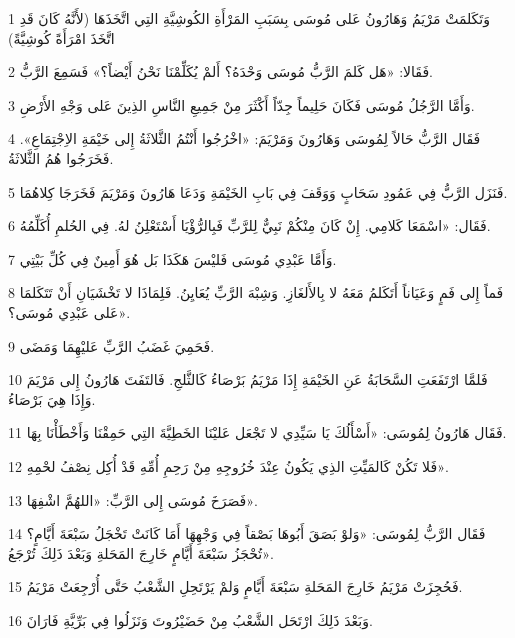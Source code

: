 \par 1 وَتَكَلمَتْ مَرْيَمُ وَهَارُونُ عَلى مُوسَى بِسَبَبِ المَرْأَةِ الكُوشِيَّةِ التِي اتَّخَذَهَا (لأَنَّهُ كَانَ قَدِ اتَّخَذَ امْرَأَةً كُوشِيَّةً)
\par 2 فَقَالا: «هَل كَلمَ الرَّبُّ مُوسَى وَحْدَهُ؟ أَلمْ يُكَلِّمْنَا نَحْنُ أَيْضاً؟» فَسَمِعَ الرَّبُّ.
\par 3 وَأَمَّا الرَّجُلُ مُوسَى فَكَانَ حَلِيماً جِدّاً أَكْثَرَ مِنْ جَمِيعِ النَّاسِ الذِينَ عَلى وَجْهِ الأَرْضِ.
\par 4 فَقَال الرَّبُّ حَالاً لِمُوسَى وَهَارُونَ وَمَرْيَمَ: «اخْرُجُوا أَنْتُمُ الثَّلاثَةُ إِلى خَيْمَةِ الاِجْتِمَاعِ». فَخَرَجُوا هُمُ الثَّلاثَةُ.
\par 5 فَنَزَل الرَّبُّ فِي عَمُودِ سَحَابٍ وَوَقَفَ فِي بَابِ الخَيْمَةِ وَدَعَا هَارُونَ وَمَرْيَمَ فَخَرَجَا كِلاهُمَا.
\par 6 فَقَال: «اسْمَعَا كَلامِي. إِنْ كَانَ مِنْكُمْ نَبِيٌّ لِلرَّبِّ فَبِالرُّؤْيَا أَسْتَعْلِنُ لهُ. فِي الحُلمِ أُكَلِّمُهُ.
\par 7 وَأَمَّا عَبْدِي مُوسَى فَليْسَ هَكَذَا بَل هُوَ أَمِينٌ فِي كُلِّ بَيْتِي.
\par 8 فَماً إِلى فَمٍ وَعَيَاناً أَتَكَلمُ مَعَهُ لا بِالأَلغَازِ. وَشِبْهَ الرَّبِّ يُعَايِنُ. فَلِمَاذَا لا تَخْشَيَانِ أَنْ تَتَكَلمَا عَلى عَبْدِي مُوسَى؟».
\par 9 فَحَمِيَ غَضَبُ الرَّبِّ عَليْهِمَا وَمَضَى.
\par 10 فَلمَّا ارْتَفَعَتِ السَّحَابَةُ عَنِ الخَيْمَةِ إِذَا مَرْيَمُ بَرْصَاءُ كَالثَّلجِ. فَالتَفَتَ هَارُونُ إِلى مَرْيَمَ وَإِذَا هِيَ بَرْصَاءُ.
\par 11 فَقَال هَارُونُ لِمُوسَى: «أَسْأَلُكَ يَا سَيِّدِي لا تَجْعَل عَليْنَا الخَطِيَّةَ التِي حَمِقْنَا وَأَخْطَأْنَا بِهَا.
\par 12 فَلا تَكُنْ كَالمَيِّتِ الذِي يَكُونُ عِنْدَ خُرُوجِهِ مِنْ رَحِمِ أُمِّهِ قَدْ أُكِل نِصْفُ لحْمِهِ».
\par 13 فَصَرَخَ مُوسَى إِلى الرَّبِّ: «اللهُمَّ اشْفِهَا».
\par 14 فَقَال الرَّبُّ لِمُوسَى: «وَلوْ بَصَقَ أَبُوهَا بَصْقاً فِي وَجْهِهَا أَمَا كَانَتْ تَخْجَلُ سَبْعَةَ أَيَّامٍ؟ تُحْجَزُ سَبْعَةَ أَيَّامٍ خَارِجَ المَحَلةِ وَبَعْدَ ذَلِكَ تُرْجَعُ».
\par 15 فَحُجِزَتْ مَرْيَمُ خَارِجَ المَحَلةِ سَبْعَةَ أَيَّامٍ وَلمْ يَرْتَحِلِ الشَّعْبُ حَتَّى أُرْجِعَتْ مَرْيَمُ.
\par 16 وَبَعْدَ ذَلِكَ ارْتَحَل الشَّعْبُ مِنْ حَضَيْرُوتَ وَنَزَلُوا فِي بَرِّيَّةِ فَارَانَ.

